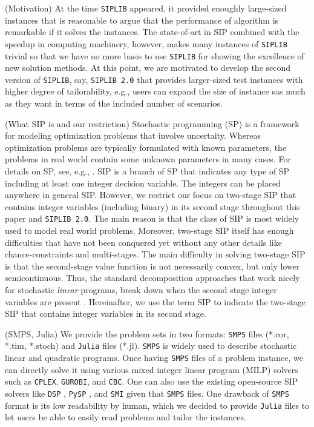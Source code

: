 (Motivation) At the time \texttt{SIPLIB} appeared, it provided enoughly large-sized instances that is reasonable to argue that the performance of algorithm is remarkable if it solves the instances. The state-of-art in SIP combined with the speedup in computing machinery, however, makes many instances of \texttt{SIPLIB} trivial so that we have no more basis to use \texttt{SIPLIB} for showing the excellence of new solution methods. At this point, we are motivated to develop the second version of \texttt{SIPLIB}, say, \texttt{SIPLIB 2.0} that provides larger-sized test instances with higher degree of tailorability, e.g., users can expand the size of instance sas much as they want in terms of the included number of scenarios.

(What SIP is and our restriction) Stochastic programming (SP) is a framework for modeling optimization problems that involve uncertaity. Whereas optimization problems are typically formulated with known parameters, the problems in real world contain some unknown parameters in many cases. For details on SP, see, e.g., \cite{web:SPS,book:BL2011}. SIP is a branch of SP that indicates any type of SP including at least one integer decision variable. The integers can be placed anywhere in general SIP. However, we restrict our focus on two-stage SIP that contains integer variables (including binary) in its second stage throughout this paper and \texttt{SIPLIB 2.0}. The main reason is that the class of SIP is most widely used to model real world problems. Moreover, two-stage SIP itself has enough difficulties that have not been conquered yet without any other details like chance-constraints and multi-stages. The main difficulty in solving two-stage SIP is that the second-stage value function is not necessarily convex, but only lower semicontinuous. Thus, the standard decomposition approaches that work nicely for stochastic \textit{linear} programs, break down when the second stage integer variables are present \cite{journal:AG2003}. Hereinafter, we use the term SIP to indicate the two-stage SIP that contains integer variables in its second stage.

(SMPS, Julia)
We provide the problem sets in two formats: \texttt{SMPS} files (*.cor, *.tim, *.stoch) and \texttt{Julia} files (*.jl). \texttt{SMPS} is widely used to describe stochastic linear and quadratic programs. Once having \texttt{SMPS} files of a problem instance, we can directly solve it using various mixed integer linear program (MILP) solvers such as \texttt{CPLEX}, \texttt{GUROBI}, and \texttt{CBC}. One can also use the existing open-source SIP solvers like \texttt{DSP} \cite{journal:KZ2015}, \texttt{PySP} \cite{journal:WWH2012}, and \texttt{SMI} \cite{web:SMI} given that \texttt{SMPS} files. One drawback of \texttt{SMPS} format is its low readability by human, which we decided to provide \texttt{Julia} files to let users be able to easily read problems and tailor the instances.

